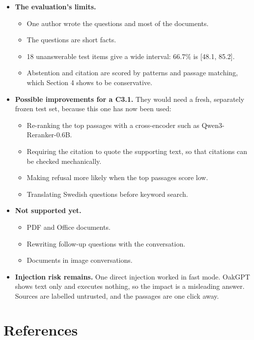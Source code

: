 \documentclass[11pt,a4paper]{article}
\begin{document}
\begin{itemize}
\item \textbf{The evaluation's limits.}
\begin{itemize}
\item One author wrote the questions and most of the documents.
\item The questions are short facts.
\item 18 unanswerable test items give a wide interval: 66.7\% is [48.1, 85.2].
\item Abstention and citation are scored by patterns and passage matching, which Section 4 shows to be conservative.
\end{itemize}
\item \textbf{Possible improvements for a C3.1.} They would need a fresh, separately frozen test set, because this one has now been used:
\begin{itemize}
\item Re-ranking the top passages with a cross-encoder such as Qwen3-Reranker-0.6B.
\item Requiring the citation to quote the supporting text, so that citations can be checked mechanically.
\item Making refusal more likely when the top passages score low.
\item Translating Swedish questions before keyword search.
\end{itemize}
\item \textbf{Not supported yet.}
\begin{itemize}
\item PDF and Office documents.
\item Rewriting follow-up questions with the conversation.
\item Documents in image conversations.
\end{itemize}
\item \textbf{Injection risk remains.} One direct injection worked in fast mode. OakGPT shows text only and executes nothing, so the impact is a misleading answer. Sources are labelled untrusted, and the passages are one click away.
\end{itemize}

\section*{References}
\end{document}
